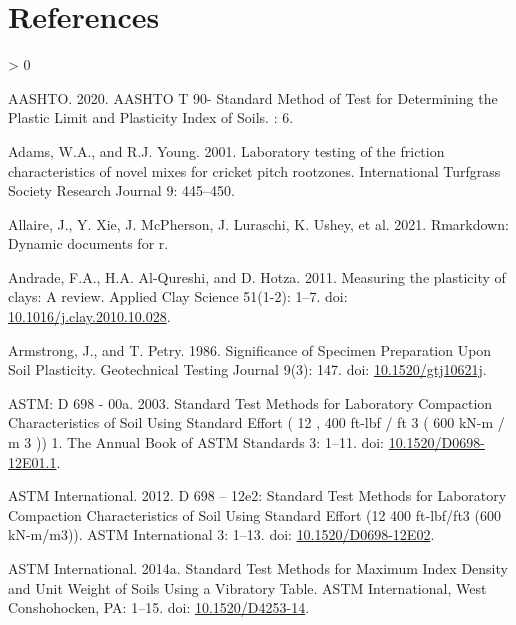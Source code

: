 \documentclass[
  letterpaper,
  openany]{book}
\newlength{\cslhangindent}
\newenvironment{CSLReferences}[2] %
 {%
  \setlength{\parindent}{0pt}
  \ifodd #1 \everypar{\setlength{\hangindent}{\cslhangindent}}\ignorespaces\fi
  \ifnum #2 > 0
  \setlength{\parskip}{#2\baselineskip}
  \fi
 }%
 {}
\begin{document}
\hypertarget{references}{%
\chapter{References}\label{references}}

\hypertarget{refs}{}
\begin{CSLReferences}{1}{0}
\leavevmode\hypertarget{ref-AASHTO2020}{}%
AASHTO. 2020. {AASHTO T 90- Standard Method of Test for Determining the Plastic Limit and Plasticity Index of Soils}. : 6.

\leavevmode\hypertarget{ref-Adams2001a}{}%
Adams, W.A., and R.J. Young. 2001. {Laboratory testing of the friction characteristics of novel mixes for cricket pitch rootzones}. International Turfgrass Society Research Journal 9: 445--450.

\leavevmode\hypertarget{ref-R-rmarkdown}{}%
Allaire, J., Y. Xie, J. McPherson, J. Luraschi, K. Ushey, et al. 2021. Rmarkdown: Dynamic documents for r.

\leavevmode\hypertarget{ref-Andrade2011}{}%
Andrade, F.A., H.A. Al-Qureshi, and D. Hotza. 2011. {Measuring the plasticity of clays: A review}. Applied Clay Science 51(1-2): 1--7. doi: \href{https://doi.org/10.1016/j.clay.2010.10.028}{10.1016/j.clay.2010.10.028}.

\leavevmode\hypertarget{ref-Armstrong1986}{}%
Armstrong, J., and T. Petry. 1986. {Significance of Specimen Preparation Upon Soil Plasticity}. Geotechnical Testing Journal 9(3): 147. doi: \href{https://doi.org/10.1520/gtj10621j}{10.1520/gtj10621j}.

\leavevmode\hypertarget{ref-ASTMD698-12e2}{}%
ASTM: D 698 - 00a. 2003. {Standard Test Methods for Laboratory Compaction Characteristics of Soil Using Standard Effort ( 12 , 400 ft-lbf / ft 3 ( 600 kN-m / m 3 )) 1}. The Annual Book of ASTM Standards 3: 1--11. doi: \href{https://doi.org/10.1520/D0698-12E01.1}{10.1520/D0698-12E01.1}.

\leavevmode\hypertarget{ref-ASTMD698-12}{}%
ASTM International. 2012. {D 698 -- 12e2: Standard Test Methods for Laboratory Compaction Characteristics of Soil Using Standard Effort (12 400 ft-lbf/ft3 (600 kN-m/m3))}. ASTM International 3: 1--13. doi: \href{https://doi.org/10.1520/D0698-12E02}{10.1520/D0698-12E02}.

\leavevmode\hypertarget{ref-ASTMD4253-16}{}%
ASTM International. 2014a. {Standard Test Methods for Maximum Index Density and Unit Weight of Soils Using a Vibratory Table}. ASTM International, West Conshohocken, PA: 1--15. doi: \href{https://doi.org/10.1520/D4253-14}{10.1520/D4253-14}.


\end{CSLReferences}
\end{document}

